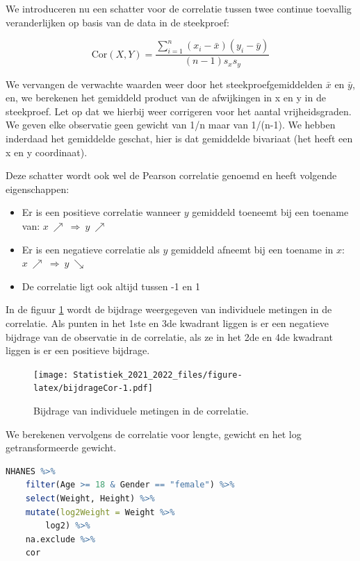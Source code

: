 \documentclass[
  12pt,dutch,coursenotes]{book}
\theoremstyle{definition}
\theoremstyle{definition}
\theoremstyle{definition}
\theoremstyle{definition}
\theoremstyle{remark}
\begin{document}
We introduceren nu een schatter voor de correlatie tussen twee continue toevallig veranderlijken op basis van de data in de steekproef:

\[
\mbox{Cor}(X,Y)=\frac{\sum_{i=1}^{n}(x_{i}-\bar{x})(y_{i}-\bar{y})}{(n-1)s_{x}s_{y}}
\]

We vervangen de verwachte waarden weer door het steekproefgemiddelden \(\bar x\) en \(\bar y\), en, we berekenen het gemiddeld product van de afwijkingen in x en y in de steekproef. Let op dat we hierbij weer corrigeren voor het aantal vrijheidsgraden. We geven elke observatie geen gewicht van 1/n maar van 1/(n-1). We hebben inderdaad het gemiddelde geschat, hier is dat gemiddelde bivariaat (het heeft een x en y coordinaat).

Deze schatter wordt ook wel de Pearson correlatie genoemd en heeft volgende eigenschappen:

\begin{itemize}
\item
  Er is een positieve correlatie wanneer \(y\) gemiddeld toeneemt bij een toename van: \(x \ \nearrow \ \Rightarrow \ y \ \nearrow\)
\item
  Er is een negatieve correlatie als \(y\) gemiddeld afneemt bij een toename in \(x\): \(x \ \nearrow \ \Rightarrow \ y \ \searrow\)
\item
  De correlatie ligt ook altijd tussen -1 en 1
\end{itemize}

In de figuur \ref{fig:bijdrageCor} wordt de bijdrage weergegeven van individuele metingen in de correlatie. Als punten in het 1ste en 3de kwadrant liggen is er een negatieve bijdrage van de observatie in de correlatie, als ze in het 2de en 4de kwadrant liggen is er een positieve bijdrage.

\begin{figure}
\centering
\texttt{[image: Statistiek\_2021\_2022\_files/figure-latex/bijdrageCor-1.pdf]}
\caption{\label{fig:bijdrageCor}Bijdrage van individuele metingen in de correlatie.}
\end{figure}

We berekenen vervolgens de correlatie voor lengte, gewicht en het log getransformeerde gewicht.

\begin{lstlisting}[language=R]
NHANES %>%
    filter(Age >= 18 & Gender == "female") %>%
    select(Weight, Height) %>%
    mutate(log2Weight = Weight %>%
        log2) %>%
    na.exclude %>%
    cor
\end{lstlisting}
\end{document}
